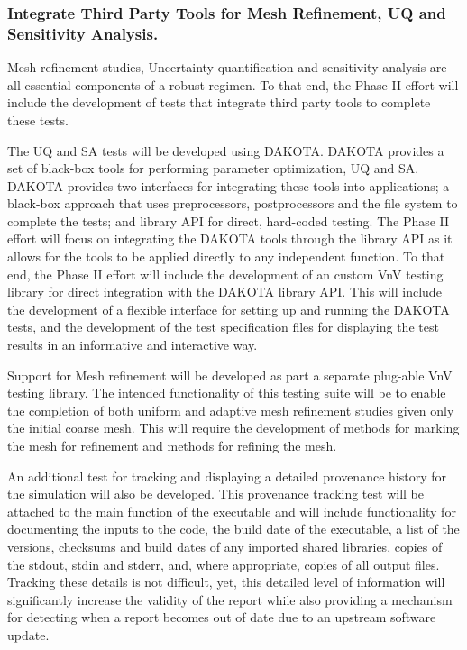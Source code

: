 \subsubsection{Integrate Third Party Tools for Mesh Refinement, UQ and Sensitivity Analysis.}

Mesh refinement studies, Uncertainty quantification and sensitivity analysis are all essential components of a robust \VV regimen. To that
end, the Phase II effort will include the development of \VV tests that integrate third party tools to complete these tests. 

The UQ and SA tests will be developed using DAKOTA. DAKOTA provides a set of black-box tools for performing parameter optimization, UQ 
and SA. DAKOTA provides two interfaces for integrating these tools into applications; a black-box approach that uses preprocessors, postprocessors
and the file system to complete the tests; and library API for direct, hard-coded testing. The Phase II effort will focus on integrating the 
DAKOTA tools through the library API as it allows for the tools to be applied directly to any independent function. To that end, the Phase II 
effort will include the development of an custom VnV testing library for direct integration with the DAKOTA library API. This will include the development
of a flexible interface for setting up and running the DAKOTA tests, and the development of the test specification files for displaying the test results 
in an informative and interactive way. 

Support for Mesh refinement will be developed as part a separate plug-able VnV testing library. The intended functionality of this testing 
suite will be to enable the completion of both uniform and adaptive mesh refinement studies given only the initial coarse mesh. This will require 
the development of methods for marking the mesh for refinement and methods for refining the mesh. 

An additional test for tracking and displaying a detailed provenance history for the simulation will also be developed. This provenance tracking
test will be attached to the main function of the executable and will include functionality for documenting the inputs to the code, the build 
date of the executable, a list of the versions, checksums and build dates of any imported shared libraries, copies of the stdout, stdin and stderr, and, where 
appropriate, copies of all output files. Tracking these details is not difficult, yet, this detailed level of information will significantly increase the validity of the \VV report while also providing a mechanism for detecting when a \VV report becomes out of date due to an upstream software update. 

